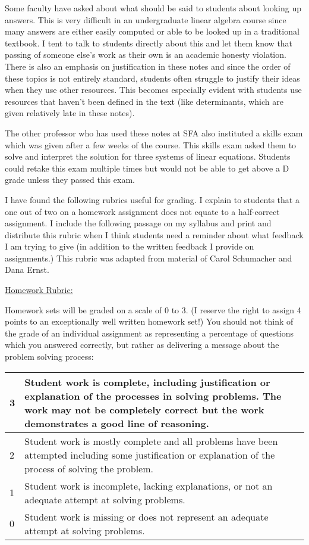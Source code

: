\begin{annotation}
Some faculty have asked about what should be said to students about looking up answers. This is very difficult in an undergraduate linear algebra course since many answers are either easily computed or able to be looked up in a traditional textbook. I tent to talk to students directly about this and let them know that passing of someone else's work as their own is an academic honesty violation. There is also an emphasis on justification in these notes and since the order of these topics is not entirely standard, students often struggle to justify their ideas when they use other resources. This becomes especially evident with students use resources that haven't been defined in the text (like determinants, which are given relatively late in these notes). 

The other professor who has used these notes at SFA also instituted a skills exam which was given after a few weeks of the course. This skills exam asked them to solve and interpret the solution for three systems of linear equations. Students could retake this exam multiple times but would not be able to get above a D grade unless they passed this exam.

I have found the following rubrics useful for grading.  I explain to students that a one out of two on a homework assignment does not equate to a half-correct assignment. I include the following passage on my syllabus and print and distribute this rubric when I think students need a reminder about what feedback I am trying to give (in addition to the written feedback I provide on assignments.) This rubric was adapted from material of Carol Schumacher and Dana Ernst.

\underline{Homework Rubric:}

Homework sets will be graded on a scale of 0 to 3. (I reserve the right to assign 4 points to an exceptionally well written homework set!) You should not think of the grade of an individual assignment as representing a percentage of questions which you answered correctly, but rather as delivering a message about the problem solving process:
\newline
\begin{tabular}{|l|p{11cm}|}
\hline
3 & Student work is complete, including justification or explanation of the processes in solving problems. The work may not be completely correct but the work demonstrates a good line of reasoning. \\
\hline
2 & Student work is mostly complete and all problems have been attempted including some justification or explanation of the process of solving the problem.\\
\hline
1 & Student work is incomplete, lacking explanations, or not an adequate attempt at solving problems. \\
\hline
0 & Student work is missing or does not represent an adequate attempt at solving problems. \\
\hline
\end{tabular}


\end{annotation}
